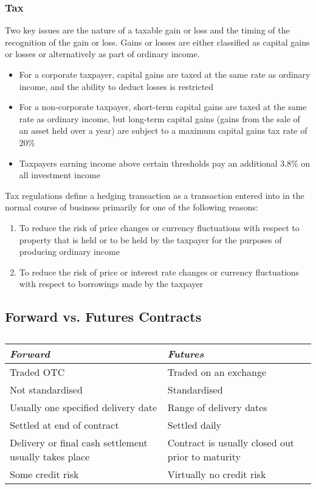 \subsubsection*{Tax}

Two key issues are the nature of a taxable gain or loss and the timing of the recognition of the gain or loss. Gains or losses are either classified as capital gains or losses or alternatively as part of ordinary income.

\begin{itemize}
    \item For a corporate taxpayer, capital gains are taxed at the same rate as ordinary income, and the ability to deduct losses is restricted
    \item For a non-corporate taxpayer, short-term capital gains are taxed at the same rate as ordinary income, but long-term capital gains (gains from the sale of an asset held over a year) are subject to a maximum capital gains tax rate of 20\%
    \item Taxpayers earning income above certain thresholds pay an additional 3.8\% on all investment income
\end{itemize}

Tax regulations define a hedging transaction as a transaction entered into in the normal course of business primarily for one of the following reasons:

\begin{enumerate}
    \item To reduce the risk of price changes or currency fluctuations with respect to property that is held or to be held by the taxpayer for the purposes of producing ordinary income
    \item To reduce the risk of price or interest rate changes or currency fluctuations with respect to borrowings made by the taxpayer
\end{enumerate}

\subsection{Forward vs. Futures Contracts}

\begin{table}[h]
    \centering
    \begin{tabular}{|l|l|}
        \hline
        \emph{Forward} & \emph{Futures} \\\hline
        Traded OTC & Traded on an exchange \\
        Not standardised & Standardised \\
        Usually one specified delivery date & Range of delivery dates \\
        Settled at end of contract & Settled daily \\
        Delivery or final cash settlement usually takes place & Contract is usually closed out prior to maturity \\
        Some credit risk & Virtually no credit risk \\\hline
    \end{tabular}
    \caption{}
\end{table}